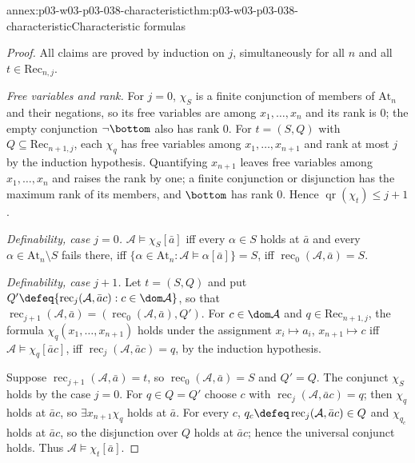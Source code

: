\begin{annexitem}{annex:p03-w03-p03-038-characteristic}{thm:p03-w03-p03-038-characteristic}{Characteristic formulas}
\begin{proof}
All claims are proved by induction on \(j\), simultaneously for all \(n\)
and all \(t\in\mathrm{Rec}_{n,j}\).

\emph{Free variables and rank.} For \(j=0\), \(\chi_S\) is a finite
conjunction of members of \(\mathrm{At}_n\) and their negations, so its
free variables are among \(x_1,\ldots,x_n\) and its rank is \(0\); the empty
conjunction \(\neg\bottom\) also has rank \(0\). For \(t=(S,Q)\) with
\(Q\subseteq\mathrm{Rec}_{n+1,j}\), each \(\chi_q\) has free variables among
\(x_1,\ldots,x_{n+1}\) and rank at most \(j\) by the induction hypothesis.
Quantifying \(x_{n+1}\) leaves free variables among \(x_1,\ldots,x_n\) and
raises the rank by one; a finite conjunction or disjunction has the maximum
rank of its members, and \(\bottom\) has rank \(0\). Hence
\(\operatorname{qr}(\chi_t)\le j+1\).

\emph{Definability, case \(j=0\).} \(\mathcal A\models\chi_S[\bar a]\) iff
every \(\alpha\in S\) holds at \(\bar a\) and every
\(\alpha\in\mathrm{At}_n\setminus S\) fails there, iff
\(\{\alpha\in\mathrm{At}_n:\mathcal A\models\alpha[\bar a]\}=S\), iff
\(\operatorname{rec}_0(\mathcal A,\bar a)=S\).

\emph{Definability, case \(j+1\).} Let \(t=(S,Q)\) and put
\(Q'\defeq\{\operatorname{rec}_j(\mathcal A,\bar ac):c\in\dom\mathcal A\}\),
so that \(\operatorname{rec}_{j+1}(\mathcal A,\bar a)=
(\operatorname{rec}_0(\mathcal A,\bar a),Q')\). For \(c\in\dom\mathcal A\)
and \(q\in\mathrm{Rec}_{n+1,j}\), the formula
\(\chi_q(x_1,\ldots,x_{n+1})\) holds under the assignment
\(x_i\mapsto a_i\), \(x_{n+1}\mapsto c\) iff \(\mathcal A\models\chi_q[\bar ac]\),
iff \(\operatorname{rec}_j(\mathcal A,\bar ac)=q\), by the induction
hypothesis.

Suppose \(\operatorname{rec}_{j+1}(\mathcal A,\bar a)=t\), so
\(\operatorname{rec}_0(\mathcal A,\bar a)=S\) and \(Q'=Q\). The conjunct
\(\chi_S\) holds by the case \(j=0\). For \(q\in Q=Q'\) choose \(c\) with
\(\operatorname{rec}_j(\mathcal A,\bar ac)=q\); then \(\chi_q\) holds at
\(\bar ac\), so \(\exists x_{n+1}\chi_q\) holds at \(\bar a\). For every
\(c\), \(q_c\defeq\operatorname{rec}_j(\mathcal A,\bar ac)\in Q\) and
\(\chi_{q_c}\) holds at \(\bar ac\), so the disjunction over \(Q\) holds at
\(\bar ac\); hence the universal conjunct holds. Thus
\(\mathcal A\models\chi_t[\bar a]\).


\end{proof}
\end{annexitem}
